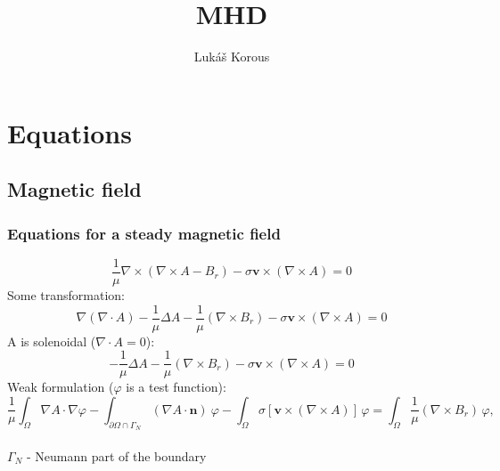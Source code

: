 \documentclass[smallextended]{svjour3}       %
\begin{document}
\title{MHD}


\author{Luk\' a\v s Korous}


\maketitle

\section{Equations}

	\subsection{Magnetic field}
	
		\subsubsection{Equations for a steady magnetic field}
		\begin{equation}
			\frac{1}{\mu}\nabla \times \left(\nabla \times A - B_r \right) - \sigma \mathbf{v} \times \left( \nabla \times A \right) = 0
		\end{equation}
		Some transformation:
		\begin{equation}
			\nabla \left(\nabla \cdot A \right) -\frac{1}{\mu}\Delta A - \frac{1}{\mu} \left(\nabla \times B_r \right) - \sigma \mathbf{v} \times \left( \nabla \times A \right) = 0
		\end{equation}
		A is solenoidal ($\nabla \cdot A = 0$):
		\begin{equation}
			-\frac{1}{\mu}\Delta A - \frac{1}{\mu} \left(\nabla \times B_r \right) - \sigma \mathbf{v} \times \left( \nabla \times A \right) = 0
		\end{equation}
		Weak formulation  ($\varphi$ is a test function):
		\begin{equation}
			\frac{1}{\mu}\int_{\Omega}\nabla A \cdot \nabla \varphi - \int_{\partial \Omega \cap \Gamma_{N}} \left(\nabla A \cdot \mathbf{n}\right)\ \varphi 
			 - \int_{\Omega} \sigma \left[\mathbf{v} \times \left( \nabla \times A \right)\right]\,\varphi = \int_{\Omega}\frac{1}{\mu} \left(\nabla \times B_r \right)\,\varphi,
		\end{equation}\ \\
		$\Gamma_{N}$ - Neumann part of the boundary\ \\
		
\end{document}
